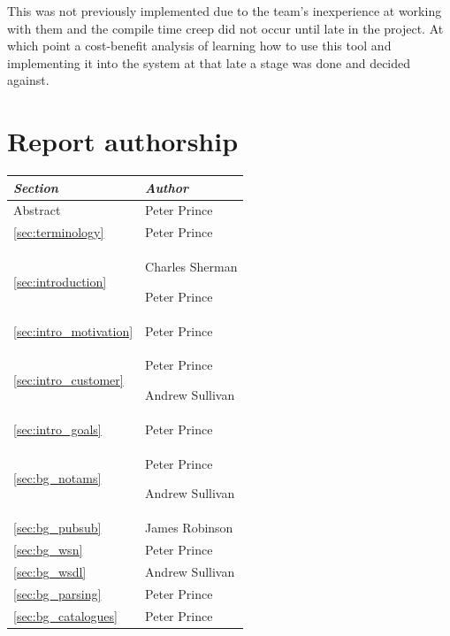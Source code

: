 \documentclass[a4paper, 12pt, twoside]{article}
\newcommand*{\fullref}[1]{\ref{#1} \nameref{#1}}
\begin{document}
This was not previously implemented due to the team's inexperience at working with them and the compile time creep did not occur until late in the project. At which point a cost-benefit analysis of learning how to use this tool and implementing it into the system at that late a stage was done and decided against.

\newpage

\sloppy
\printbibliography

\appendix

\section{Report authorship}

\begin{tabularx}{\textwidth}{|X|X|} \hline
  \emph{Section}                         & \emph{Author}                      \\ \hline
  Abstract                               & Peter Prince                       \\ \hline
  \fullref{sec:terminology}              & Peter Prince                       \\ \hline
  \fullref{sec:introduction}             & Charles Sherman\par Peter Prince   \\ \hline
  \fullref{sec:intro_motivation}         & Peter Prince                       \\
  \fullref{sec:intro_customer}           & Peter Prince\par Andrew Sullivan   \\
  \fullref{sec:intro_goals}              & Peter Prince                       \\ \hline
  \fullref{sec:bg_notams}                & Peter Prince\par Andrew Sullivan   \\
  \fullref{sec:bg_pubsub}                & James Robinson                     \\
  \fullref{sec:bg_wsn}                   & Peter Prince                       \\
  \fullref{sec:bg_wsdl}                  & Andrew Sullivan                    \\
  \fullref{sec:bg_parsing}               & Peter Prince                       \\
  \fullref{sec:bg_catalogues}            & Peter Prince                       \\

\end{tabularx}
\end{document}
